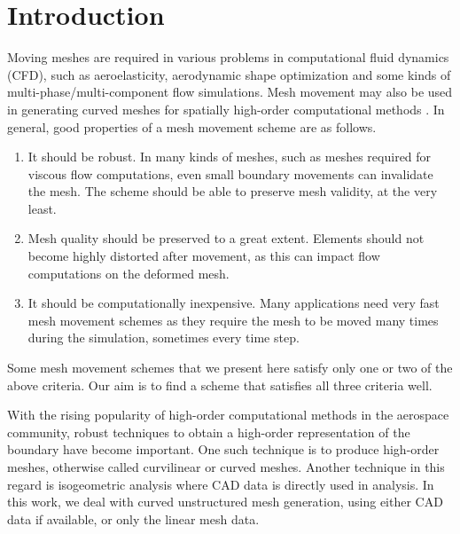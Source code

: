 \chapter{Introduction}

Moving meshes are required in various problems in computational fluid dynamics (CFD), such as aeroelasticity, aerodynamic shape optimization \cite{appl:opt} and some kinds of multi-phase/multi-component flow simulations. Mesh movement may also be used in generating curved meshes for spatially high-order computational methods \cite{curve:persson}. In general, good properties of a mesh movement scheme are as follows.
\begin{enumerate}
\item It should be robust. In many kinds of meshes, such as meshes required for viscous flow computations, even small boundary movements can invalidate the mesh. The scheme should be able to preserve mesh validity, at the very least.
\item Mesh quality should be preserved to a great extent. Elements should not become highly distorted after movement, as this can impact flow computations on the deformed mesh.
\item It should be computationally inexpensive. Many applications need very fast mesh movement schemes as they require the mesh to be moved many times during the simulation, sometimes every time step.
\end{enumerate}
Some mesh movement schemes that we present here satisfy only one or two of the above criteria. Our aim is to find a scheme that satisfies all three criteria well.

With the rising popularity of high-order computational methods in the aerospace community, robust techniques to obtain a high-order representation of the boundary have become important. One such technique is to produce high-order meshes, otherwise called curvilinear or curved meshes. Another technique in this regard is isogeometric analysis \cite{isogeometric} where CAD data is directly used in analysis. In this work, we deal with curved unstructured mesh generation, using either CAD data if available, or only the linear mesh data.
